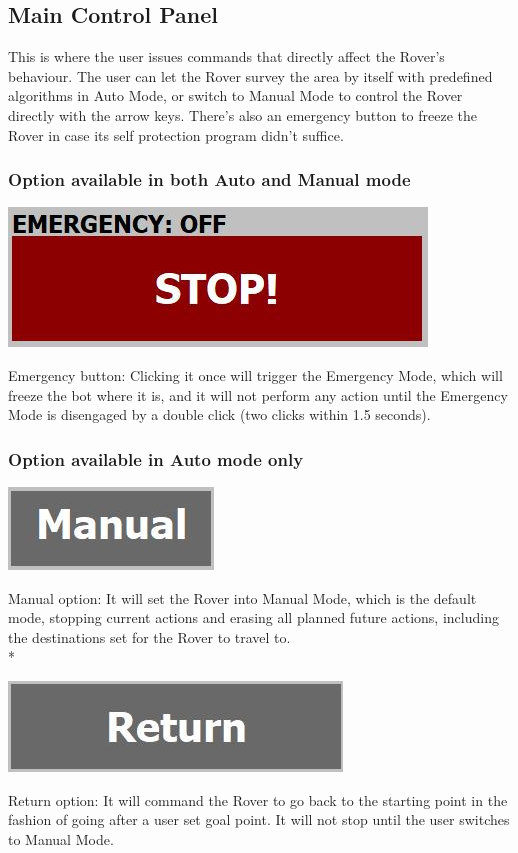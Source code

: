 \documentclass[12pt]{article}
\begin{document}
	\subsection{Main Control Panel}
This is where the user issues commands that directly affect the Rover’s behaviour. The user can let the Rover survey the area by itself with predefined algorithms in Auto Mode, or switch to Manual Mode to control the Rover directly with the arrow keys. There’s also an emergency button to freeze the Rover in case its self protection program didn’t suffice.
	\subsubsection{Option available in both Auto and Manual mode}	
		\begin{center}		
		\includegraphics[scale = 1]{Emergency.jpg}
		\end{center}
Emergency button: Clicking it once will trigger the Emergency Mode, which will freeze the bot where it is, and it will not perform any action until the Emergency Mode is disengaged by a double click (two clicks within 1.5 seconds).	
	
	\subsubsection{Option available in Auto mode only}
		\begin{center}
		\includegraphics[scale = 1]{Manual.jpg}	
		\end{center}	
Manual option: It will set the Rover into Manual Mode, which is the default mode, stopping current actions and erasing all planned future actions, including the destinations set for the Rover to travel to.
\\*
		\begin{center}
		\includegraphics[scale = 1]{Return.jpg}
		\end{center}
Return option: It will command the Rover to go back to the starting point in the fashion of going after a user set goal point. It will not stop until the user switches to Manual Mode.
	
\end{document}
